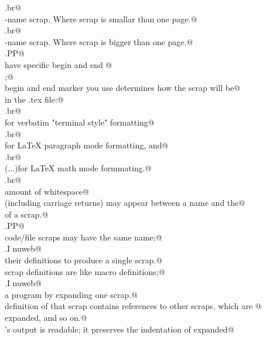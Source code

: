 \documentclass{report}
\begin{document}
\begin{flushleft}
\begin{list}{}{}
\mbox{}\verb@.br@\\
\mbox{}\verb@d \fImacro-name scrap\fP. Where scrap is smallar than one page.@\\
\mbox{}\verb@.br@\\
\mbox{}\verb@D \fImacro-name scrap\fP. Where scrap is bigger than one page.@\\
\mbox{}\verb@.PP@\\
\mbox{}\verb@Scraps have specific begin and end @\\
\mbox{}\verb@markers;@\\
\mbox{}\verb@which begin and end marker you use determines how the scrap will be@\\
\mbox{}\verb@typeset in the .tex file:@\\
\mbox{}\verb@.br@\\
\mbox{}\verb@{}\fP for verbatim "terminal style" formatting@\\
\mbox{}\verb@.br@\\
\mbox{}\verb@{}\verb@[\fP...\fB@{\tt @}\verb@]\fP for LaTeX paragraph mode formatting, and@\\
\mbox{}\verb@.br@\\
\mbox{}\verb@{}\verb@(\fP...\verb@)\fP for LaTeX math mode formmating.@\\
\mbox{}\verb@.br@\\
\mbox{}\verb@Any amount of whitespace@\\
\mbox{}\verb@(including carriage returns) may appear between a name and the@\\
\mbox{}\verb@begining of a scrap.@\\
\mbox{}\verb@.PP@\\
\mbox{}\verb@Several code/file scraps may have the same name;@\\
\mbox{}\verb@.I nuweb@\\
\mbox{}\verb@concatenates their definitions to produce a single scrap.@\\
\mbox{}\verb@Code scrap definitions are like macro definitions;@\\
\mbox{}\verb@.I nuweb@\\
\mbox{}\verb@extracts a program by expanding one scrap.@\\
\mbox{}\verb@The definition of that scrap contains references to other scraps, which are @\\
\mbox{}\verb@themselves expanded, and so on.@\\
\mbox{}\verb@\fINuweb\fP's output is readable; it preserves the indentation of expanded@\\

\end{list}
\end{flushleft}
\end{document}

